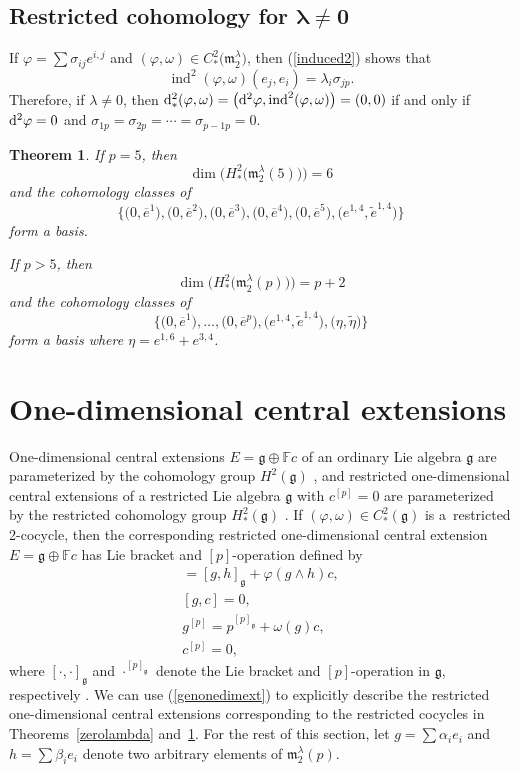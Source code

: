 \documentclass[pdftex]{sigma}
\def\ind{\operatorname{ind}}
\def\phi{\varphi}
\def\g{\mathfrak g}
\def\m{\mathfrak m}
\def\F{\mathbb F}
\numberwithin{equation}{section}
\newtheorem{Theorem}{Theorem}[section]
\begin{document}
\subsection[Restricted cohomology for $\lambda\ne 0$]{Restricted cohomology for $\boldsymbol{\lambda\ne 0}$}\label{section4.3}

If $\phi=\sum\sigma_{ij}e^{i,j}$ and $(\phi,\omega)\in C^2_*\big(\m_2^\lambda\big)$, then (\ref{induced2}) shows that
\[\ind^2(\phi,\omega)(e_j,e_i)=\lambda_i\sigma_{jp}.\]
Therefore, if $\lambda\ne 0$, then
${\rm d}^2_*(\phi,\omega)=\big({\rm d}^2\phi,\ind^2(\phi,\omega)\big)=(0,0)$ if and only
if ${\rm d}^2\phi=0$ and $\sigma_{1p}=\sigma_{2p}=\cdots = \sigma_{p-1 p}=0$.

\begin{Theorem}\label{nonzerolambda}
 If $p=5$, then
 \[\dim\big(H^2_*\big(\m_2^\lambda(5)\big)\big)=6\] and the cohomology
 classes of
 \[\big\{\big(0,\overline e^1\big), \big(0,\overline e^2\big),\big(0,\overline
 e^3\big),\big(0,\overline e^4\big), \big(0,\overline e^5\big), \big( e^{1,4},\tilde
 e^{1,4}\big)\big\}\] form a basis.

 If $p>5$, then
 \[\dim\big(H^2_*\big(\m_2^\lambda(p)\big)\big)=p+2\] and the cohomology
 classes of
 \[\big\{\big(0,\overline e^1\big),\dots, \big(0,\overline e^p\big),\big( e^{1,4},\tilde
 e^{1,4}\big),\big(\eta,\tilde \eta\big)\big\}\] form a basis where $\eta=e^{1,6}+e^{3,4} $.
\end{Theorem}

\section{One-dimensional central extensions}\label{section5}

One-dimensional central extensions $E=\g\oplus\F c$ of an ordinary Lie algebra $\g$ are parameterized by the cohomology group $H^2(\g)$ \cite[Chapter~1, Section~4.6]{FuchsBook}, and restricted one-dimensional central extensions of a restricted Lie algebra $\g$ with $c^{[p]}=0$ are parameterized by the restricted cohomology group $H^2_*(\g)$
\cite[Theorem~3.3]{Hochschild1954}. If $(\phi,\omega)\in C^2_*(\g)$ is a~restricted 2-cocycle, then the corresponding restricted one-dimensional central extension $E=\g\oplus\F c$ has Lie bracket and $[p]$-operation defined by
\begin{gather}
 [g,h] =[g,h]_{\g}+\phi(g\wedge h) c,\nonumber\\
 [g, c] = 0,\nonumber\\
 g^{[p]} = p^{[p]_{\g}}+\omega(g) c,\nonumber\\
 c^{[p]} = 0,\label{genonedimext}
\end{gather}
where $[\cdot,\cdot]_\g$ and $\cdot^{[p]_\g}$ denote the Lie bracket and $[p]$-operation in $\g$, respectively \cite[equations~(26) and~(27)]{EvansFuchs2008}. We can use (\ref{genonedimext}) to explicitly describe the restricted one-dimensional central extensions corresponding to the restricted cocycles in Theorems~\ref{zerolambda} and~\ref{nonzerolambda}. For the rest of this section, let $g=\sum \alpha_ie_i$ and $h=\sum\beta_ie_i$ denote two arbitrary elements of $\m_2^\lambda(p)$.
\end{document}
